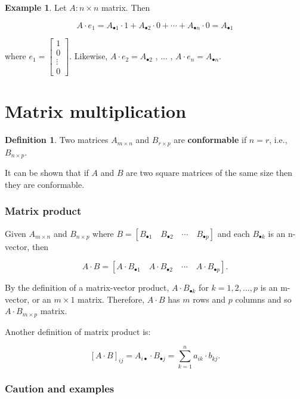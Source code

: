 \documentclass[12pt]{article}
\theoremstyle{definition}
\newtheorem*{definition}{Definition}
\newtheorem*{example}{Example}
\begin{document}
\begin{example}
Let $A: n \times n$ matrix. Then

\[
A \cdot e_1 = A_{\bullet 1} \cdot 1 + A_{\bullet 2} \cdot 0 + \cdots + A_{\bullet n} \cdot 0 = A_{\bullet 1}
\]

where $e_1 = \begin{bmatrix} 1 \\ 0 \\ \vdots \\ 0 \end{bmatrix}$. Likewise,
$A \cdot e_2 = A_{\bullet 2}$ , $\ldots$ , $A \cdot e_n = A_{\bullet n}$.
\end{example}

\section{Matrix multiplication}

\begin{definition}
Two matrices $A_{m \times n}$ and $B_{r \times p}$ are \textbf{conformable} if $n = r$, i.e., $B_{n \times p}$.
\end{definition}

It can be shown that if $A$ and $B$ are two square matrices of the same size then they are conformable.

\subsubsection{Matrix product}

Given $A_{m \times n}$ and $B_{n \times p}$ where $B = [B_{\bullet 1} \quad B_{\bullet 2} \quad \cdots \quad B_{\bullet p}]$ and
each $B_{\bullet k}$ is an n-vector, then

\[
A \cdot B = [A \cdot B_{\bullet 1} \quad A \cdot B_{\bullet 2} \quad \cdots \quad A \cdot B_{\bullet p}].
\]

By the definition of a matrix-vector product, $A \cdot B_{\bullet k}$ for $k = 1, 2, \ldots, p$ is an m-vector,
or an $m \times 1$ matrix. Therefore, $A \cdot B$ has $m$ rows and $p$ columns and so $A \cdot B_{m \times p}$
matrix.

Another definition of matrix product is:

\[
\left[ A \cdot B \right]_{ij} = A_{i \bullet} \cdot B_{\bullet j} = \sum_{k = 1}^{n} a_{ik} \cdot b_{kj}.
\]

\subsubsection{Caution and examples}
\end{document}
